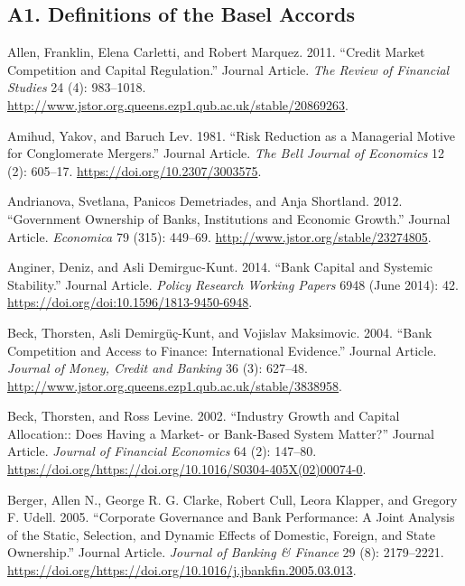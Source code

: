 \documentclass{article}
\begin{document}
\hypertarget{a1.-definitions-of-the-basel-accords}{%
\subsection*{A1. Definitions of the Basel
Accords}\label{a1.-definitions-of-the-basel-accords}}

\hypertarget{refs}{}
\leavevmode\hypertarget{ref-RN15}{}%
Allen, Franklin, Elena Carletti, and Robert Marquez. 2011. ``Credit
Market Competition and Capital Regulation.'' Journal Article. \emph{The
Review of Financial Studies} 24 (4): 983--1018.
\url{http://www.jstor.org.queens.ezp1.qub.ac.uk/stable/20869263}.

\leavevmode\hypertarget{ref-RN16}{}%
Amihud, Yakov, and Baruch Lev. 1981. ``Risk Reduction as a Managerial
Motive for Conglomerate Mergers.'' Journal Article. \emph{The Bell
Journal of Economics} 12 (2): 605--17.
\url{https://doi.org/10.2307/3003575}.

\leavevmode\hypertarget{ref-RN17}{}%
Andrianova, Svetlana, Panicos Demetriades, and Anja Shortland. 2012.
``Government Ownership of Banks, Institutions and Economic Growth.''
Journal Article. \emph{Economica} 79 (315): 449--69.
\url{http://www.jstor.org/stable/23274805}.

\leavevmode\hypertarget{ref-RN18}{}%
Anginer, Deniz, and Asli Demirguc-Kunt. 2014. ``Bank Capital and
Systemic Stability.'' Journal Article. \emph{Policy Research Working
Papers} 6948 (June 2014): 42.
\url{https://doi.org/doi:10.1596/1813-9450-6948}.

\leavevmode\hypertarget{ref-RN22}{}%
Beck, Thorsten, Asli Demirgüç-Kunt, and Vojislav Maksimovic. 2004.
``Bank Competition and Access to Finance: International Evidence.''
Journal Article. \emph{Journal of Money, Credit and Banking} 36 (3):
627--48.
\url{http://www.jstor.org.queens.ezp1.qub.ac.uk/stable/3838958}.

\leavevmode\hypertarget{ref-RN23}{}%
Beck, Thorsten, and Ross Levine. 2002. ``Industry Growth and Capital
Allocation:: Does Having a Market- or Bank-Based System Matter?''
Journal Article. \emph{Journal of Financial Economics} 64 (2): 147--80.
\url{https://doi.org/https://doi.org/10.1016/S0304-405X(02)00074-0}.

\leavevmode\hypertarget{ref-RN25}{}%
Berger, Allen N., George R. G. Clarke, Robert Cull, Leora Klapper, and
Gregory F. Udell. 2005. ``Corporate Governance and Bank Performance: A
Joint Analysis of the Static, Selection, and Dynamic Effects of
Domestic, Foreign, and State Ownership.'' Journal Article. \emph{Journal
of Banking \& Finance} 29 (8): 2179--2221.
\url{https://doi.org/https://doi.org/10.1016/j.jbankfin.2005.03.013}.
\end{document}
